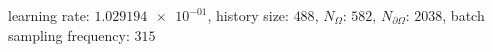 learning rate: $\num[scientific-notation=true]{1.029194e-01}$, history size: $\num[scientific-notation=false]{488}$, $N_{\Omega}$: $\num[scientific-notation=false]{582}$, $N_{\partial\Omega}$: $\num[scientific-notation=false]{2038}$, batch sampling frequency: $\num[scientific-notation=false]{315}$